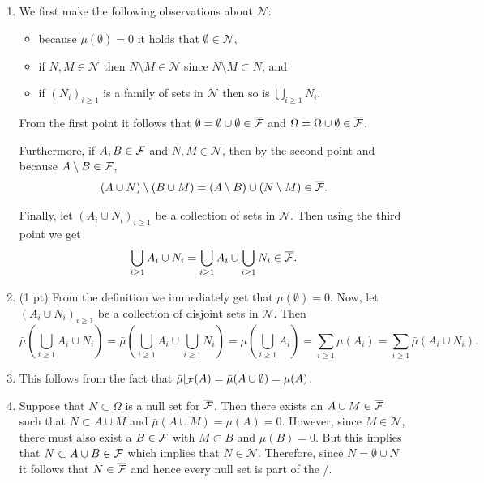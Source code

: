 \begin{enumerate}[label=(\alph*)]
\item

We first make the following observations about $\mathcal{N}$:
\begin{itemize}
\item because $\mu(\emptyset) = 0$ it holds that $\emptyset \in \mathcal{N}$,
\item if $N, M \in \mathcal{N}$ then $N \setminus M \in \mathcal{N}$ since $N \setminus M \subset N$, and
\item if $(N_i)_{i \ge 1}$ is a family of sets in $\mathcal{N}$ then so is $\bigcup_{i \ge 1} N_i$.
\end{itemize}

From the first point it follows that $\emptyset = \emptyset \cup \emptyset \in \overline{\mathcal F}$ and $\Omega = \Omega \cup \emptyset \in \overline{\mathcal F}$.

Furthermore, if $A, B \in \mathcal F$ and $N, M \in \mathcal{N}$, then by the second point and because $A \setminus B \in \mathcal F$,
\[
	(A \cup N) \setminus (B \cup M) = (A \setminus B) \cup (N \setminus M) \in \overline{\mathcal F}.
\]

Finally, let $(A_i \cup N_i)_{i \ge 1}$ be a collection of sets in $\mathcal{N}$. Then using the third point we get
\[
	\bigcup_{i \ge 1} A_i \cup N_i = \bigcup_{i \ge 1} A_i \cup \bigcup_{i \ge 1} N_i \in \overline{\mathcal F}.
\]
\item (1 pt) From the definition we immediately get that $\mu(\emptyset) = 0$. Now, let $(A_i \cup N_i)_{i \ge 1}$ be a collection of disjoint sets in $\mathcal{N}$. Then
\[
	\bar{\mu}(\bigcup_{i \ge 1} A_i \cup N_i) = \bar{\mu}(\bigcup_{i \ge 1} A_i \cup \bigcup_{i \ge 1} N_i)
	= \mu(\bigcup_{i \ge 1} A_i) = \sum_{i \ge 1} \mu(A_i) = \sum_{i \ge 1} \bar{\mu}(A_i \cup N_i).
\]
\item 
This follows from the fact that $\bar{\mu}|_{\mathcal F}(A) = \bar{\mu}(A \cup \emptyset) = \mu(A)$.
\item 
Suppose that $N \subset \Omega$ is a null set for $\overline{\mathcal F}$. Then there exists an $A \cup M \in \overline{\mathcal F}$ such that $N \subset A \cup M$ and $\bar{\mu}(A \cup M) = \mu(A) = 0$. However, since $M \in \mathcal{N}$, there must also exist a $B \in \mathcal F$ with $M \subset B$ and $\mu(B) = 0$. But this implies that $N \subset A \cup B \in \mathcal F$ which implies that $N \in \mathcal{N}$. Therefore, since $N = \emptyset \cup N$ it follows that $N \in \overline{\mathcal F}$ and hence every null set is part of the \sigalg/.
\end{enumerate}